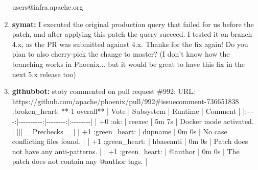 \documentclass{report}%
\begin{document}
\begin{enumerate}
users@infra.apache.org\newline%
%
\item%
\textbf{symat: }I executed the original production query that failed for us before the patch, and after applying this patch the query succeed. I tested it on branch 4.x, as the PR was submitted against 4.x. Thanks for the fix again!\newline%
\newline%
\newline%
\newline%
Do you plan to also cherry{-}pick the change to master? (I don't know how the branching works in Phoenix... but it would be great to have this fix in the next 5.x release too)%
\item%
\textbf{githubbot: }stoty commented on pull request \#992:\newline%
URL: https://github.com/apache/phoenix/pull/992\#issuecomment{-}736651838\newline%
\newline%
\newline%
   :broken\_heart: **{-}1 overall**\newline%
\newline%
  \newline%
  \newline%
  \newline%
  \newline%
  \newline%
  \newline%
   | Vote | Subsystem | Runtime | Comment |\newline%
\newline%
   |:{-}{-}{-}{-}:|{-}{-}{-}{-}{-}{-}{-}{-}{-}{-}:|{-}{-}{-}{-}{-}{-}{-}{-}:|:{-}{-}{-}{-}{-}{-}{-}{-}|\newline%
\newline%
   | +0 :ok: |  reexec  |   5m  7s |  Docker mode activated.  |\newline%
\newline%
   ||| \_ Prechecks \_ |\newline%
\newline%
   | +1 :green\_heart: |  dupname  |   0m  0s |  No case conflicting files found.  |\newline%
\newline%
   | +1 :green\_heart: |  hbaseanti  |   0m  0s |  Patch does not have any anti{-}patterns.  |\newline%
\newline%
   | +1 :green\_heart: |  @author  |   0m  0s |  The patch does not contain any @author tags.  |\newline%

\end{enumerate}
\end{document}
